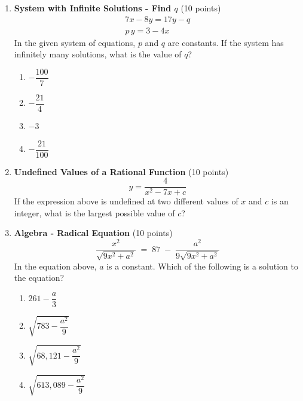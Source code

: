 \begin{enumerate}
  \item \textbf{System with Infinite Solutions - Find $q$} (10 points)\\
  \[
  \begin{gathered}
  7x-8y = 17y - q \\
  p\,y = 3 - 4x
  \end{gathered}
  \]
  In the given system of equations, $p$ and $q$ are constants. If the system has infinitely many solutions, what is the value of $q$?
  \begin{enumerate}[label=(\Alph*)]
    \item $-\dfrac{100}{7}$
    \item $-\dfrac{21}{4}$
    \item $-3$
    \item $-\dfrac{21}{100}$
  \end{enumerate}
  \begin{subanswer}
  \end{subanswer}

  \item \textbf{Undefined Values of a Rational Function} (10 points)\\
  \[
  y=\frac{4}{x^2-7x+c}
  \]
  If the expression above is undefined at two different values of $x$ and $c$ is an integer, what is the largest possible value of $c$?
  \begin{subanswer}
  \end{subanswer}






  \item \textbf{Algebra - Radical Equation} (10 points)\\
  \[
  \frac{x^2}{\sqrt{9x^2+a^2}} \;=\; 87 \;-\; \frac{a^2}{9\sqrt{9x^2+a^2}}
  \]
  In the equation above, $a$ is a constant. Which of the following is a solution to the equation?
  \begin{enumerate}[label=(\Alph*)]
    \item $261-\dfrac{a}{3}$
    \item $\sqrt{783-\dfrac{a^2}{9}}$
    \item $\sqrt{68{,}121-\dfrac{a^2}{9}}$
    \item $\sqrt{613{,}089-\dfrac{a^2}{9}}$
  \end{enumerate}
  \begin{subanswer}
  \end{subanswer}


\end{enumerate}

